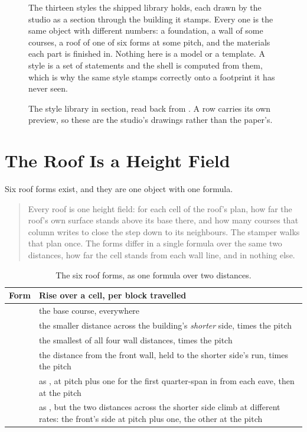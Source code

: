 \begin{figure}[htbp]
\medskip
{\small\begin{minipage}{0.95\textwidth}
The thirteen styles the shipped library holds, each drawn by the studio as a
section through the building it stamps. Every one is the same object with different
numbers: a foundation, a wall of some courses, a roof of one of six forms at some
pitch, and the materials each part is finished in. Nothing here is a model or a
template. A style is a set of statements and the shell is computed from them, which
is why the same style stamps correctly onto a footprint it has never seen.
\end{minipage}}
\caption{The style library in section, read back from
. A row carries its own preview, so these are the
studio's drawings rather than the paper's.}
\label{fig:styles}
\end{figure}

\section{The Roof Is a Height Field}

Six roof forms exist, and they are one object with one formula.

\begin{quote}
Every roof is one height field: for each cell of the roof's plan, how far the
roof's own surface stands above its base there, and how many courses that column
writes to close the step down to its neighbours. The stamper walks that plan once.
The forms differ in a single formula over the same two distances, how far the cell
stands from each wall line, and in nothing else.
\end{quote}

\begin{table}[htbp]
\caption{The six roof forms, as one formula over two distances.}
\label{tab:roofs}
\small
\begin{tabularx}{\textwidth}{L{2.2cm} Y}
\toprule
\textbf{Form} & \textbf{Rise over a cell, per block travelled} \\
\midrule
{} & the base course, everywhere \\
 & the smaller distance across the building's \emph{shorter} side, times
  the pitch \\
 & the smallest of all four wall distances, times the pitch \\
 & the distance from the front wall, held to the shorter side's run,
  times the pitch \\
 & as , at pitch plus one for the first quarter-span in from
  each eave, then at the pitch \\
 & as , but the two distances across the shorter side climb
  at different rates: the front's side at pitch plus one, the other at the pitch \\
\bottomrule
\end{tabularx}
\end{table}

